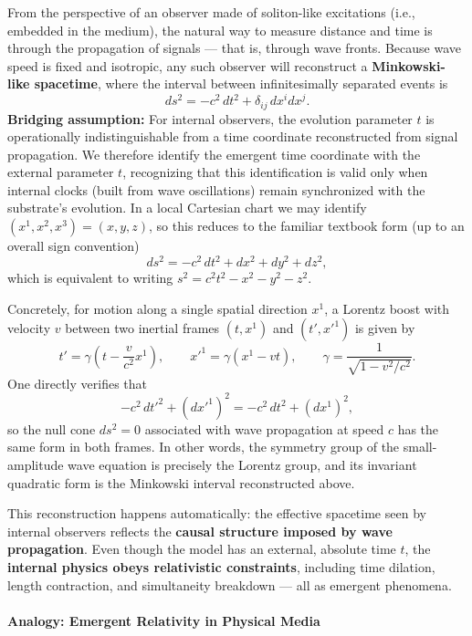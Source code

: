 From the perspective of an observer made of soliton-like excitations
(i.e., embedded in the medium), the natural way to measure distance and
time is through the propagation of signals --- that is, through wave
fronts. Because wave speed is fixed and isotropic, any such observer
will reconstruct a \textbf{Minkowski-like spacetime}, where the interval
between infinitesimally separated events is
\[
ds^2 = -c^2\,dt^2 + \delta_{ij}\,dx^i dx^j.
\]
\textbf{Bridging assumption:} For internal observers, the evolution parameter $t$ is operationally indistinguishable from a time coordinate reconstructed from signal propagation. We therefore identify the emergent time coordinate with the external parameter $t$, recognizing that this identification is valid only when internal clocks (built from wave oscillations) remain synchronized with the substrate's evolution.
In a local Cartesian chart we may identify $(x^1,x^2,x^3)=(x,y,z)$, so
this reduces to the familiar textbook form (up to an overall sign
convention)
\[
ds^2 = -c^2\,dt^2 + dx^2 + dy^2 + dz^2,
\]
which is equivalent to writing $s^2 = c^2 t^2 - x^2 - y^2 - z^2$.

Concretely, for motion along a single spatial direction $x^1$, a
Lorentz boost with velocity $v$ between two inertial frames
$(t,x^1)$ and $(t',x'^1)$ is given by
\[
t' = \gamma\left(t - \frac{v}{c^2}x^1\right), \qquad
x'^1 = \gamma(x^1 - vt), \qquad
\gamma = \frac{1}{\sqrt{1-v^2/c^2}}.
\]
One directly verifies that
\[
-c^2\,dt'^2 + (dx'^1)^2 = -c^2\,dt^2 + (dx^1)^2,
\]
so the null cone $ds^2=0$ associated with wave propagation at speed $c$
has the same form in both frames. In other words, the symmetry group of
the small-amplitude wave equation is precisely the Lorentz group, and
its invariant quadratic form is the Minkowski interval reconstructed
above.

This reconstruction happens automatically: the effective spacetime seen
by internal observers reflects the \textbf{causal structure imposed by
wave propagation}. Even though the model has an external, absolute time
$t$, the \textbf{internal physics obeys relativistic constraints},
including time dilation, length contraction, and simultaneity breakdown
--- all as emergent phenomena.

\paragraph{Analogy: Emergent Relativity in Physical
Media}\label{analogy-emergent-relativity-in-physical-media}

